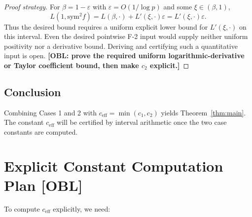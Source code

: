 \documentclass[12pt]{article}
\begin{document}
\begin{proof}[Proof strategy]
For $\beta=1-\varepsilon$ with $\varepsilon=O(1/\log p)$ and some
$\xi\in(\beta,1)$,
\[
  L(1,\mathrm{sym}^2 f)=L(\beta,\cdot)+L'(\xi,\cdot)\varepsilon
  =L'(\xi,\cdot)\varepsilon .
\]
Thus the desired bound requires a uniform explicit lower bound for
$L'(\xi,\cdot)$ on this interval.  Even the desired pointwise F-2 input would
supply neither uniform positivity nor a derivative bound.  Deriving and
certifying such a quantitative input is open.
\textbf{[OBL: prove the required uniform logarithmic-derivative or Taylor
coefficient bound, then make $c_2$ explicit.]}
\end{proof}

\subsection{Conclusion}

Combining Cases 1 and 2 with $c_{\mathrm{eff}} = \min(c_1, c_2)$ yields
Theorem~\ref{thm:main}.  The constant $c_{\mathrm{eff}}$ will be certified by
interval arithmetic once the two case constants are computed.

\section{Explicit Constant Computation Plan [OBL]}

To compute $c_{\mathrm{eff}}$ explicitly, we need:
\end{document}
